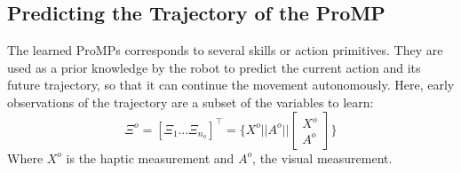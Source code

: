 \documentclass[runningheads,a4paper]{llncs}
\begin{document}
\subsection{Predicting the Trajectory of the ProMP} %
\label{ssec:prediction}


The learned ProMPs corresponds to several skills or action primitives. They are used as a prior knowledge by the robot to predict the current action and its future trajectory, so that it can continue the movement autonomously.
Here, early observations of the trajectory are a subset of the variables to learn:
\begin{equation}
\Xi^{o} = [\Xi_1 \ldots \Xi_{n_o}]^\top = \{X^o ||  A^o || \left[\begin{matrix}X^o \\ A^o\end{matrix}\right] \}
\end{equation}
Where $X^o$ is the haptic measurement and $A^o$, the visual measurement.
\end{document}
